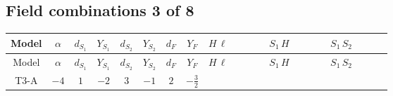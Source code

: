 \documentclass[8pt]{article}
\begin{document}
\begin{landscape}
\subsection*{Field combinations 3 of 8}
\begin{longtable}{@{}cccccccc >{\raggedright\arraybackslash}p{0.21\linewidth} >{\raggedright\arraybackslash}p{0.21\linewidth} >{\raggedright\arraybackslash}p{0.21\linewidth}@{}}
\toprule
Model & $\alpha$ & $d_{S_1}$ & $Y_{S_1}$ & $d_{S_2}$ & $Y_{S_2}$ & $d_F$ & $Y_F$ & $H\,\ell$ & $S_1\,H$ & $S_1\,S_2$ \\
\midrule
\endfirsthead
\toprule
Model & $\alpha$ & $d_{S_1}$ & $Y_{S_1}$ & $d_{S_2}$ & $Y_{S_2}$ & $d_F$ & $Y_F$ & $H\,\ell$ & $S_1\,H$ & $S_1\,S_2$ \\
\midrule
\endhead
T3-A & $-4$ & $1$ & $-2$ & $3$ & $-1$ & $2$ & $-\frac{3}{2}$ & \scriptsize\adjustbox{max width=\linewidth}{$\begin{gathered} +\frac{2 \hbar  \overline{y_{1,i_1,r_1}} \overline{y_{2,i_2,r_1}} L_{a_4,i_2}{}^T\, C\, P_L\, L_{a_2,i_1} H_{a_1} H_{a_3} \lambda_5 \epsilon_{a_1,a_2} \epsilon_{a_3,a_4}}{\sqrt{3} \epsilon  M_F} \\ +\frac{2 \hbar  \overline{y_{1,i_1,r_1}} \overline{y_{2,i_2,r_1}} L_{a_4,i_2}{}^T\, C\, P_L\, L_{a_2,i_1} H_{a_1} H_{a_3} \lambda_5 \epsilon_{a_1,a_2} \epsilon_{a_3,a_4}}{\sqrt{3} M_F} \\ +\frac{2 \hbar  \overline{\lambda_5} \overline{L_{a_3,i_1}}\, C\, P_R\, \overline{L_{a_4,i_2}}{}^T y_{1,i_1,r_1} y_{2,i_2,r_1} \epsilon_{a_1,a_3} \epsilon_{a_2,a_4} H_{a_1}{}^{\dagger } H_{a_2}{}^{\dagger }}{\sqrt{3} \epsilon  M_F}\end{gathered}$} & \scriptsize\adjustbox{max width=\linewidth}{$\begin{gathered} -\frac{2 \hbar  \overline{y_{1,i_1,r_1}} \overline{Y_{e,i_2,i_3}} H_{a_1} S_1 y_{1,i_2,r_1} Y_{e,i_1,i_3} H_{a_1}{}^{\dagger } S_1{}^{\dagger }}{\epsilon } \\ -2 \hbar  \overline{y_{1,i_1,r_1}} \overline{Y_{e,i_2,i_3}} H_{a_1} S_1 y_{1,i_2,r_1} Y_{e,i_1,i_3} H_{a_1}{}^{\dagger } S_1{}^{\dagger } \\ +H_{a_2} S_1 H_{a_1}{}^{\dagger } S_1{}^{\dagger } \mathcal{I}_{H1,a_1,a_2}{}^1 \lambda_{HS_1}^{(1)}^{(1)}\end{gathered}$} & \scriptsize\adjustbox{max width=\linewidth}{$\begin{gathered} -\frac{4 \hbar  \overline{y_{1,i_1,r_1}} \overline{y_{2,i_2,r_2}} S_1 S_{2,j_1} y_{1,i_2,r_1} y_{2,i_1,r_2} S_1{}^{\dagger } S_{2,j_1}{}^{\dagger }}{\sqrt{3} \epsilon } \\ +\frac{4 \hbar  \overline{y_{1,i_1,r_1}} \overline{y_{2,i_2,r_1}} S_1 S_{2,j_1} y_{1,i_2,r_2} y_{2,i_1,r_2} S_1{}^{\dagger } S_{2,j_1}{}^{\dagger }}{\sqrt{3}} \\ +\frac{4 \hbar  \overline{y_{1,i_1,r_1}} \overline{y_{2,i_2,r_1}} S_1 S_{2,j_1} y_{1,i_1,r_2} y_{2,i_2,r_2} S_1{}^{\dagger } S_{2,j_1}{}^{\dagger }}{\sqrt{3}}\end{gathered}$} \\

\end{longtable}
\end{landscape}
\end{document}
